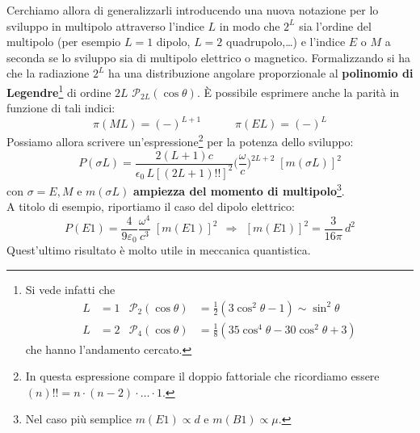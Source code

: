 \noindent Cerchiamo allora di generalizzarli introducendo una nuova notazione per lo sviluppo in multipolo attraverso l'indice $L$ in modo che $2^L$ sia l'ordine del multipolo (per esempio $L=1$ dipolo, $L=2$ quadrupolo,\dots) e l'indice $E$ o $M$ a seconda se lo sviluppo sia di multipolo elettrico o magnetico. Formalizzando si ha che la radiazione $2^L$ ha una distribuzione angolare proporzionale al \textbf{polinomio di Legendre}\footnote{Si vede infatti che 
\begin{displaymath}
\begin{aligned}
L&=1 & \mathcal{P}_2(\cos{\theta})&= \frac{1}{2} (3\cos^2{\theta}-1)\sim\sin^2{\theta} \\
L&=2 & \mathcal{P}_4(\cos{\theta})&= \frac{1}{8} (35\cos^4{\theta}-30\cos^2{\theta}+3)
\end{aligned}
\end{displaymath}
che hanno l'andamento cercato.} di ordine $2L$ $\mathcal{P}_{2L}(\cos{\theta})$. È possibile esprimere anche la parità in funzione di tali indici:
$$\pi(ML)= (-)^{L+1} \qquad\quad \pi(EL)=(-)^L$$
Possiamo allora scrivere un'espressione\footnote{In questa espressione compare il doppio fattoriale che ricordiamo essere $(n)!! = n\cdot(n-2)\cdot\dots\cdot 1.$} per la potenza dello sviluppo:
$$P(\sigma L) = \frac{2(L+1)c}{\epsilon_0\,L[(2L+1)!!]^2} \bigl ( \frac{\omega}{c}\bigr)^{2L+2} \; [m(\sigma L)]^2 $$
con $\sigma = E,M$ e $m(\sigma L)$ \textbf{ampiezza del momento di multipolo}\footnote{Nel caso più semplice $m(E1) \propto d$ e $m(B1)\propto \mu$.}.\\
A titolo di esempio, riportiamo il caso del dipolo elettrico:
$$P(E1) = \frac{4}{9\varepsilon_0}\frac{\omega^4}{c^3}\;[m(E1)]^2 \;\,\Rightarrow\;\, [m(E1)]^2 = \frac{3}{16\pi}\,d^2$$
Quest'ultimo risultato è molto utile in meccanica quantistica.

